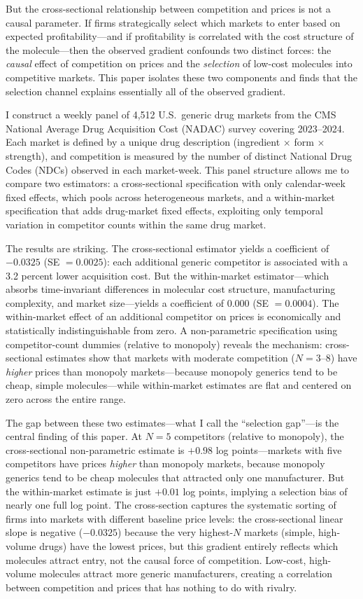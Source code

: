 \documentclass[12pt]{article}
\begin{document}
But the cross-sectional relationship between competition and prices is not a causal parameter. If firms strategically select which markets to enter based on expected profitability---and if profitability is correlated with the cost structure of the molecule---then the observed gradient confounds two distinct forces: the \emph{causal} effect of competition on prices and the \emph{selection} of low-cost molecules into competitive markets. This paper isolates these two components and finds that the selection channel explains essentially all of the observed gradient.

I construct a weekly panel of 4,512 U.S.\ generic drug markets from the CMS National Average Drug Acquisition Cost (NADAC) survey covering 2023--2024. Each market is defined by a unique drug description (ingredient $\times$ form $\times$ strength), and competition is measured by the number of distinct National Drug Codes (NDCs) observed in each market-week. This panel structure allows me to compare two estimators: a cross-sectional specification with only calendar-week fixed effects, which pools across heterogeneous markets, and a within-market specification that adds drug-market fixed effects, exploiting only temporal variation in competitor counts within the same drug market.

The results are striking. The cross-sectional estimator yields a coefficient of $-0.0325$ (SE $= 0.0025$): each additional generic competitor is associated with a 3.2 percent lower acquisition cost. But the within-market estimator---which absorbs time-invariant differences in molecular cost structure, manufacturing complexity, and market size---yields a coefficient of $0.000$ (SE $= 0.0004$). The within-market effect of an additional competitor on prices is economically and statistically indistinguishable from zero. A non-parametric specification using competitor-count dummies (relative to monopoly) reveals the mechanism: cross-sectional estimates show that markets with moderate competition ($N = 3$--$8$) have \emph{higher} prices than monopoly markets---because monopoly generics tend to be cheap, simple molecules---while within-market estimates are flat and centered on zero across the entire range.

The gap between these two estimates---what I call the ``selection gap''---is the central finding of this paper. At $N = 5$ competitors (relative to monopoly), the cross-sectional non-parametric estimate is $+0.98$ log points---markets with five competitors have prices \emph{higher} than monopoly markets, because monopoly generics tend to be cheap molecules that attracted only one manufacturer. But the within-market estimate is just $+0.01$ log points, implying a selection bias of nearly one full log point. The cross-section captures the systematic sorting of firms into markets with different baseline price levels: the cross-sectional linear slope is negative ($-0.0325$) because the very highest-$N$ markets (simple, high-volume drugs) have the lowest prices, but this gradient entirely reflects which molecules attract entry, not the causal force of competition. Low-cost, high-volume molecules attract more generic manufacturers, creating a correlation between competition and prices that has nothing to do with rivalry.
\end{document}
